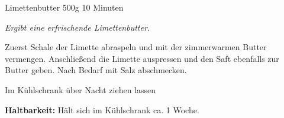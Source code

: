 \documentclass[
  DIV=11,%
  pagesize,%
  fontsize=11pt,%
  paper=a4,%
]{scrartcl}
\begin{document}
\begin{recipe}{Limettenbutter} {500g} {10 Minuten}

\freeform
\textit{Ergibt eine erfrischende Limettenbutter.}


Zuerst Schale der Limette abraspeln und mit der zimmerwarmen Butter vermengen.
Anschließend die Limette auspressen und den Saft ebenfalls zur Butter geben.
Nach Bedarf mit Salz abschmecken.

\newstep
Im Kühlschrank über Nacht ziehen lassen

\freeform
\hrulefill

\freeform 
\textbf{Haltbarkeit:}
Hält sich im Kühlschrank ca. 1 Woche.

\end{recipe}
\end{document}
